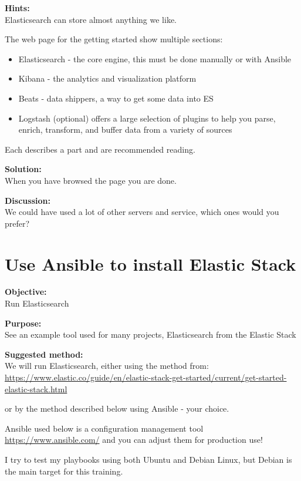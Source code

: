 \documentclass[a4paper,11pt,notitlepage]{report}
\begin{document}
{\bf Hints:}\\
Elasticsearch can store almost anything we like.

The web page for the getting started show multiple sections:
\begin{itemize}
\item Elasticsearch - the core engine, this must be done manually or with Ansible
\item Kibana - the analytics and visualization platform
\item Beats - data shippers, a way to get some data into ES
\item Logstash (optional) offers a large selection of plugins to help you parse, enrich, transform, and buffer data from a variety of sources
\end{itemize}

Each describes a part and are recommended reading.


{\bf Solution:}\\
When you have browsed the page you are done.

{\bf Discussion:}\\
We could have used a lot of other servers and service, which ones would you prefer?



\chapter{Use Ansible to install Elastic Stack}
\label{ex:basicansible}


{\bf Objective:}\\
Run Elasticsearch

{\bf Purpose:}\\
See an example tool used for many projects, Elasticsearch from the Elastic Stack

{\bf Suggested method:}\\
We will run Elasticsearch, either using the method from:\\{\footnotesize
\url{https://www.elastic.co/guide/en/elastic-stack-get-started/current/get-started-elastic-stack.html}}

or by the method described below using Ansible - your choice.

Ansible used below is a configuration management tool \url{https://www.ansible.com/} and you can adjust them for production use!

I try to test my playbooks using both Ubuntu and Debian Linux, but Debian is the main target for this training.
\end{document}
